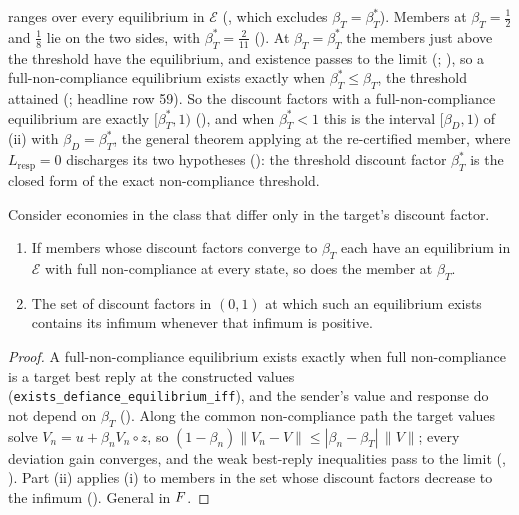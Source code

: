 ranges over every equilibrium in $\mathcal E$
(, which excludes $\beta_T=\beta_T^*$). Members at
$\beta_T=\tfrac12$ and $\tfrac18$ lie on the two sides, with $\beta_T^*=\tfrac2{11}$
(). At $\beta_T=\beta_T^*$ the
members just above the threshold have the equilibrium, and existence passes to the
limit (; ),
so a full-non-compliance equilibrium exists exactly when $\beta_T^*\le\beta_T$, the
threshold attained (; headline row 59).
So the discount factors with a
full-non-compliance equilibrium are exactly $[\beta_T^*,1)$
(), and when $\beta_T^*<1$ this is the
interval $[\beta_D,1)$ of (ii) with $\beta_D=\beta_T^*$,
the general theorem applying at the re-certified member, where
$L_{\mathrm{resp}}=0$ discharges its two hypotheses
(): the threshold discount factor $\beta_T^*$ is the closed form
of the exact non-compliance threshold.

\begin{proposition}
\label{prop:defiance-closed}
Consider economies in the class that differ only in the target's discount factor.
\begin{enumerate}[label=(\roman*)]
\item If members whose discount factors converge to $\beta_T$ each have an equilibrium in
$\mathcal E$ with full non-compliance at every state, so does the member at $\beta_T$.
\item The set of discount factors in $(0,1)$ at which such an equilibrium exists
contains its infimum whenever that infimum is positive.
\end{enumerate}
\end{proposition}

\begin{proof}
A full-non-compliance equilibrium exists exactly when full non-compliance is a target best reply at
the constructed values (\texttt{exists\_defiance\_equilibrium\_iff}), and the sender's
value and response do not depend on $\beta_T$ ().
Along the common non-compliance path the target values solve $V_n=u+\beta_nV_n\circ z$, so
$(1-\beta_n)\|V_n-V\|\le|\beta_n-\beta_T|\,\|V\|$; every deviation gain converges, and
the weak best-reply inequalities pass to the limit
(, ).
Part (ii) applies (i) to members in the set whose discount factors decrease to the
infimum (). General in $F$.
\end{proof}

